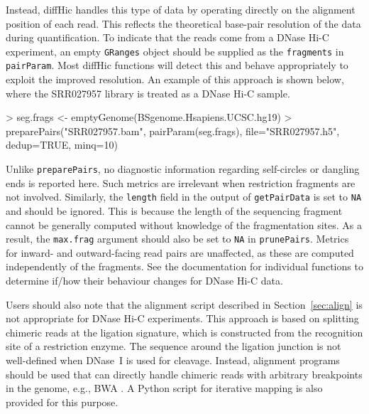 \documentclass[12pt]{report}
\renewenvironment{Schunk}{\vspace{0pt}}{\vspace{0pt}}
\newcommand{\pkgname}{diffHic}
\newcommand{\code}[1]{{\small\texttt{#1}}}
\begin{document}
Instead, \pkgname{} handles this type of data by operating directly on the alignment position of each read.
This reflects the theoretical base-pair resolution of the data during quantification.
To indicate that the reads come from a DNase Hi-C experiment, an empty \code{GRanges} object should be supplied as the \code{fragments} in \code{pairParam}.
Most \pkgname{} functions will detect this and behave appropriately to exploit the improved resolution.
An example of this approach is shown below, where the SRR027957 library is treated as a DNase Hi-C sample.

\begin{Schunk}
\begin{Sinput}
> seg.frags <- emptyGenome(BSgenome.Hsapiens.UCSC.hg19)
> preparePairs("SRR027957.bam", pairParam(seg.frags), file="SRR027957.h5", dedup=TRUE, minq=10)
\end{Sinput}
\end{Schunk}

Unlike \code{preparePairs}, no diagnostic information regarding self-circles or dangling ends is reported here.
Such metrics are irrelevant when restriction fragments are not involved.
Similarly, the \code{length} field in the output of \code{getPairData} is set to \code{NA} and should be ignored.
This is because the length of the sequencing fragment cannot be generally computed without knowledge of the fragmentation sites.
As a result, the \code{max.frag} argument should also be set to \code{NA} in \code{prunePairs}.
Metrics for inward- and outward-facing read pairs are unaffected, as these are computed independently of the fragments.
See the documentation for individual functions to determine if/how their behaviour changes for DNase Hi-C data.

Users should also note that the alignment script described in Section~\ref{sec:align} is not appropriate for DNase Hi-C experiments.
This approach is based on splitting chimeric reads at the ligation signature, which is constructed from the recognition site of a restriction enzyme.
The sequence around the ligation junction is not well-defined when DNase~I is used for cleavage.
Instead, alignment programs should be used that can directly handle chimeric reads with arbitrary breakpoints in the genome, e.g., BWA \citep{li2010fast}.
A Python script for iterative mapping \citep{imakaev2012iterative} is also provided for this purpose.
\end{document}
